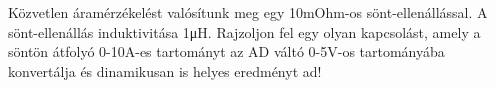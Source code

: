 \begin{example}

Közvetlen áramérzékelést valósítunk meg egy 10mOhm-os sönt-ellenállással. A sönt-ellenállás induktivitása 1μH. Rajzoljon fel egy olyan kapcsolást, amely a söntön átfolyó 0-10A-es tartományt az AD váltó 0-5V-os tartományába konvertálja és dinamikusan is helyes eredményt ad!

\tcbline
\vspace{1mm}

\solution

\end{example}